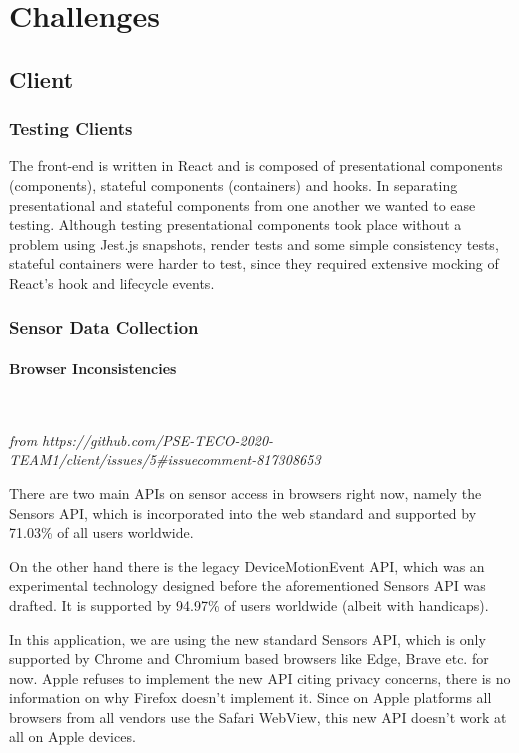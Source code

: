 \section{Challenges}
\subsection{Client}
\subsubsection{Testing Clients}
The front-end is written in React and is composed of presentational components (components), stateful components (containers) and hooks. In separating presentational and stateful components from one another we wanted to ease testing. Although testing presentational components took place without a problem using Jest.js snapshots, render tests and some simple consistency tests, stateful containers were harder to test, since they required extensive mocking of React's hook and lifecycle events.

\subsubsection{Sensor Data Collection}
\paragraph{Browser Inconsistencies} \

\textit{from https://github.com/PSE-TECO-2020-TEAM1/client/issues/5\#issuecomment-817308653}

There are two main APIs on sensor access in browsers right now, namely the Sensors API, which is incorporated into the web standard and supported by 71.03\% of all users worldwide.

On the other hand there is the legacy DeviceMotionEvent API, which was an experimental technology designed before the aforementioned Sensors API was drafted. It is supported by 94.97\% of users worldwide (albeit with handicaps).

In this application, we are using the new standard Sensors API, which is only supported by Chrome and Chromium based browsers like Edge, Brave etc. for now. Apple refuses to implement the new API citing privacy concerns, there is no information on why Firefox doesn't implement it. Since on Apple platforms all browsers from all vendors use the Safari WebView, this new API doesn't work at all on Apple devices.

